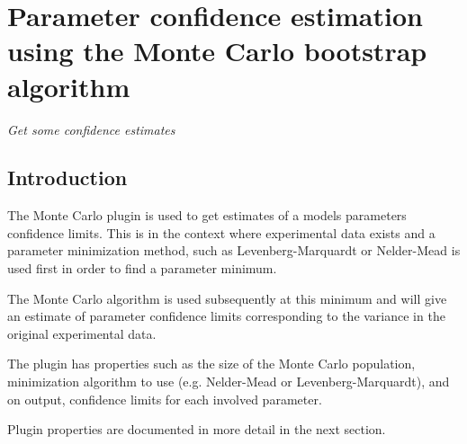 
\newcommand{\pname}{Monte Carlo}

\chapter*{Parameter confidence estimation using the Monte Carlo bootstrap algorithm}
\setcounter{chapter}{1}
\emph{Get some confidence estimates}
\section{Introduction}
The Monte Carlo plugin is used to get estimates of a models parameters confidence limits. This is in the context where experimental data exists and a parameter minimization method, such as Levenberg-Marquardt or Nelder-Mead is used first in order to find a parameter minimum.

The Monte Carlo algorithm is used subsequently at this minimum and will give an estimate of parameter confidence limits corresponding to the variance in the original experimental data.

The plugin has properties such as the size of the Monte Carlo population, minimization algorithm to use (e.g. Nelder-Mead or Levenberg-Marquardt), and on output, confidence limits for each involved parameter.

Plugin properties are documented in more detail in the next section.

